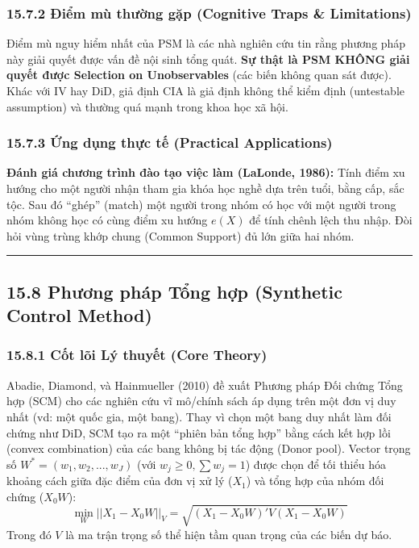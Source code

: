\documentclass[
]{article}
\begin{document}
\subsubsection{15.7.2 Điểm mù thường gặp (Cognitive Traps \&
Limitations)}\label{ux111iux1ec3m-muxf9-thux1b0ux1eddng-gux1eb7p-cognitive-traps-limitations-103}

Điểm mù nguy hiểm nhất của PSM là các nhà nghiên cứu tin rằng phương
pháp này giải quyết được vấn đề nội sinh tổng quát. \textbf{Sự thật là
PSM KHÔNG giải quyết được Selection on Unobservables} (các biến không
quan sát được). Khác với IV hay DiD, giả định CIA là giả định không thể
kiểm định (untestable assumption) và thường quá mạnh trong khoa học xã
hội.

\subsubsection{15.7.3 Ứng dụng thực tế (Practical
Applications)}\label{ux1ee9ng-dux1ee5ng-thux1ef1c-tux1ebf-practical-applications-59}

\textbf{Đánh giá chương trình đào tạo việc làm (LaLonde, 1986):} Tính
điểm xu hướng cho một người nhận tham gia khóa học nghề dựa trên tuổi,
bằng cấp, sắc tộc. Sau đó ``ghép'' (match) một người trong nhóm có học
với một người trong nhóm không học có cùng điểm xu hướng \(e(X)\) để
tính chênh lệch thu nhập. Đòi hỏi vùng trùng khớp chung (Common Support)
đủ lớn giữa hai nhóm.

\begin{center}\rule{0.5\linewidth}{0.5pt}\end{center}

\subsection{15.8 Phương pháp Tổng hợp (Synthetic Control
Method)}\label{phux1b0ux1a1ng-phuxe1p-tux1ed5ng-hux1ee3p-synthetic-control-method}

\subsubsection{15.8.1 Cốt lõi Lý thuyết (Core
Theory)}\label{cux1ed1t-luxf5i-luxfd-thuyux1ebft-core-theory-53}

Abadie, Diamond, và Hainmueller (2010) đề xuất Phương pháp Đối chứng
Tổng hợp (SCM) cho các nghiên cứu vĩ mô/chính sách áp dụng trên một đơn
vị duy nhất (vd: một quốc gia, một bang). Thay vì chọn một bang duy nhất
làm đối chứng như DiD, SCM tạo ra một ``phiên bản tổng hợp'' bằng cách
kết hợp lồi (convex combination) của các bang không bị tác động (Donor
pool). Vector trọng số \(W^* = (w_1, w_2, ..., w_J)\) (với
\(w_j \ge 0, \sum w_j = 1\)) được chọn để tối thiểu hóa khoảng cách giữa
đặc điểm của đơn vị xử lý (\(X_1\)) và tổng hợp của nhóm đối chứng
(\(X_0 W\)):
\[ \min_{W} ||X_1 - X_0 W||_V = \sqrt{(X_1 - X_0 W)' V (X_1 - X_0 W)} \]
Trong đó \(V\) là ma trận trọng số thể hiện tầm quan trọng của các biến
dự báo.
\end{document}
